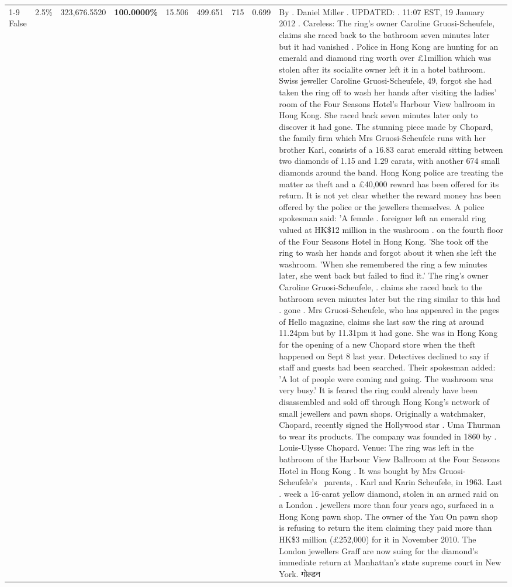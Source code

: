 \begin{table}[H]
\begin{tabular}{lllrlllll}
\cline{1-9}
False & 2.5\% & 323,676.5520 & \bfseries \color{red} 100.0000\% & 15.506 & 499.651 & 715 & 0.699 & By . Daniel Miller . UPDATED: . 11:07 EST, 19 January 2012 . Careless: The ring's owner Caroline Gruosi-Scheufele, claims she raced back to the bathroom seven minutes later but it had vanished . Police in Hong Kong are hunting for an emerald and diamond ring worth over £1million which was stolen after its socialite owner left it in a hotel bathroom. Swiss jeweller Caroline Gruosi-Scheufele, 49, forgot she had taken the ring off to wash her hands after visiting the ladies' room of the Four Seasons Hotel's Harbour View ballroom in Hong Kong. She raced back seven minutes later only to discover it had gone. The stunning piece made by Chopard, the family firm which Mrs Gruosi-Scheufele runs with her brother Karl, consists of a 16.83 carat emerald sitting between two diamonds of 1.15 and 1.29 carats, with another 674 small diamonds around the band. Hong Kong police are treating the matter as theft and a £40,000 reward has been offered for its return. It is not yet clear whether the reward money has been offered by the police or the jewellers themselves. A police spokesman said: 'A female . foreigner left an emerald ring valued at HK\$12 million in the washroom . on the fourth floor of the Four Seasons Hotel in Hong Kong. 'She took off the ring to wash her hands and forgot about it when she left the washroom. 'When she remembered the ring a few minutes later, she went back but failed to find it.' The ring's owner Caroline Gruosi-Scheufele, . claims she raced back to the bathroom seven minutes later but the ring similar to this had . gone . Mrs Gruosi-Scheufele, who has appeared in the pages of Hello magazine, claims she last saw the ring at around 11.24pm but by 11.31pm it had gone. She was in Hong Kong for the opening of a new Chopard store when the theft happened on Sept 8 last year. Detectives declined to say if staff and guests had been searched. Their spokesman added: 'A lot of people were coming and going. The washroom was very busy.' It is feared the ring could already have been disassembled and sold off through Hong Kong's network of small jewellers and pawn shops. Originally a watchmaker, Chopard, recently signed the Hollywood star . Uma Thurman to wear its products. The company was founded in 1860 by . Louis-Ulysse Chopard. Venue: The ring was left in the bathroom of the Harbour View Ballroom at the Four Seasons Hotel in Hong Kong . It was bought by Mrs Gruosi-Scheufele's  parents, . Karl and Karin Scheufele, in 1963. Last . week a 16-carat yellow diamond, stolen in an armed raid on a London . jewellers more than four years ago, surfaced in a Hong Kong pawn shop. The owner of the Yau On pawn shop is refusing to return the item claiming they paid more than HK\$3 million (£252,000) for it in November 2010. The London jewellers Graff are now suing for the diamond’s immediate return at Manhattan’s state supreme court in New York. गोल्डन \\

\end{tabular}
\end{table}
